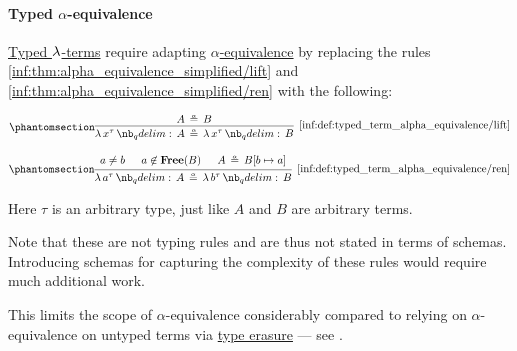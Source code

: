 \paragraph{Typed \( \alpha \)-equivalence}

\begin{definition}\label{def:typed_term_alpha_equivalence}
  \hyperref[def:typed_lambda_term]{Typed \( \mathrm{\lambda} \)-terms} require adapting \hyperref[def:lambda_term_alpha_equivalence]{\( \alpha \)-equivalence} by replacing the rules \ref{inf:thm:alpha_equivalence_simplified/lift} and \ref{inf:thm:alpha_equivalence_simplified/ren} with the following:
  \begin{paracol}{2}
    \begin{leftcolumn}
      \begin{equation*}\taglabel[\ensuremath{ \logic{Lift}_\alpha^{\T{tt}} }]{inf:def:typed_term_alpha_equivalence/lift}
        \begin{prooftree}
          \hypo{ A \aequiv B }
          \infer1[\ref{inf:def:typed_term_alpha_equivalence/lift}]{ \qabs {x^\tau} A \aequiv \qabs {x^\tau} B }
        \end{prooftree}
      \end{equation*}
    \end{leftcolumn}

    \begin{rightcolumn}
      \begin{equation*}\taglabel[\ensuremath{ \logic{Ren}_\alpha^{\T{tt}} }]{inf:def:typed_term_alpha_equivalence/ren}
        \begin{prooftree}
          \hypo{ a \neq b }
          \hypo{ a \not\in \op*{Free}(B) }
          \hypo{ A \aequiv B[b \mapsto a] }
          \infer3[\ref{inf:def:typed_term_alpha_equivalence/ren}]{ \qabs {a^\tau} A \aequiv \qabs {b^\tau} B }
        \end{prooftree}
      \end{equation*}
    \end{rightcolumn}
  \end{paracol}
\end{definition}
\begin{comments}
  \item Here \( \tau \) is an arbitrary type, just like \( A \) and \( B \) are arbitrary terms.

  \item Note that these are not typing rules and are thus not stated in terms of schemas. Introducing schemas for capturing the complexity of these rules would require much additional work.

  \item This limits the scope of \( \alpha \)-equivalence considerably compared to relying on \( \alpha \)-equivalence on untyped terms via \hyperref[alg:type_erasure]{type erasure} --- see .
\end{comments}


